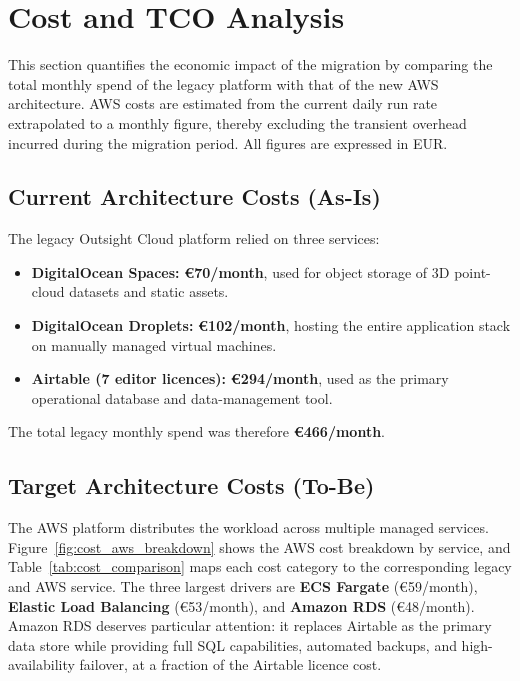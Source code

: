 \section{Cost and TCO Analysis}
\label{sec:costanalysis}

This section quantifies the economic impact of the migration by comparing
the total monthly spend of the legacy platform with that of the new AWS
architecture.
AWS costs are estimated from the current daily run rate extrapolated to
a monthly figure, thereby excluding the transient overhead incurred
during the migration period.
All figures are expressed in EUR.

\subsection{Current Architecture Costs (As-Is)}

The legacy Outsight Cloud platform relied on three services:

\begin{itemize}
  \item \textbf{DigitalOcean Spaces:} \textbf{€70/month}, used for
    object storage of 3D point-cloud datasets and static assets.
  \item \textbf{DigitalOcean Droplets:} \textbf{€102/month}, hosting
    the entire application stack on manually managed virtual machines.
  \item \textbf{Airtable (7 editor licences):} \textbf{€294/month},
    used as the primary operational database and data-management tool.
\end{itemize}

The total legacy monthly spend was therefore \textbf{€466/month}.

\subsection{Target Architecture Costs (To-Be)}

The AWS platform distributes the workload across multiple managed
services.
Figure~\ref{fig:cost_aws_breakdown} shows the AWS cost breakdown by
service, and Table~\ref{tab:cost_comparison} maps each cost category to
the corresponding legacy and AWS service.
The three largest drivers are \textbf{ECS Fargate} (€59/month),
\textbf{Elastic Load Balancing} (€53/month), and \textbf{Amazon RDS}
(€48/month).
Amazon RDS deserves particular attention: it replaces Airtable as the
primary data store while providing full SQL capabilities, automated
backups, and high-availability failover, at a fraction of the
Airtable licence cost.

